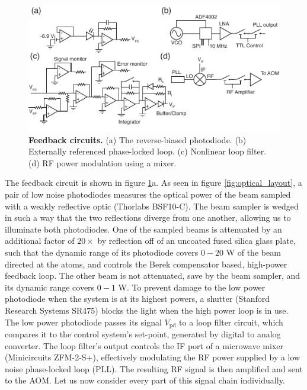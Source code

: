 \documentclass[twocolumn,aps,pra,showpacs,preprintnumbers,bibnotes]{revtex4-1}
\begin{document}
\begin{figure}
  \begin{center}
    \includegraphics{fig/circuits.pdf}
    \caption{\textbf{Feedback circuits.} (a) The reverse-biased photodiode. (b) Externally referenced phase-locked loop. (c) Nonlinear loop filter. (d) RF power modulation using a mixer.}\label{fig:circuits}
  \end{center}
\end{figure}
The feedback circuit is shown in figure \ref{fig:circuits}a. As seen in figure \ref{fig:optical_layout}, a pair of low noise photodiodes measures the optical power of the beam sampled with a weakly reflective optic (Thorlabs BSF10-C). 
The beam sampler is wedged in such a way that the two reflections diverge from one another, allowing us to illuminate both photodiodes. 
One of the sampled beams is attenuated by an additional factor of $20\times$ by reflection off of an uncoated fused silica glass plate, such that the dynamic range of its photodiode covers $0-20$ W of the beam directed at the atoms, and controls the Berek compensator based, high-power feedback loop. 
The other beam is not attenuated, save by the beam sampler, and its dynamic range covers $0-1$ W.
To prevent damage to the low power photodiode when the system is at its highest powers, a shutter (Stanford Research Systems SR475) blocks the light when the high power loop is in use.
The low power photodiode passes its signal $V_{\mathrm{pd}}$ to a loop filter circuit, which compares it to the control system's set-point, generated by digital to analog converter.
The loop filter's output controls the IF port of a microwave mixer (Minicircuits ZFM-2-S+), effectively modulating the RF power supplied by a low noise phase-locked loop (PLL).
The resulting RF signal is then amplified and sent to the AOM.
Let us now consider every part of this signal chain individually.
\end{document}
